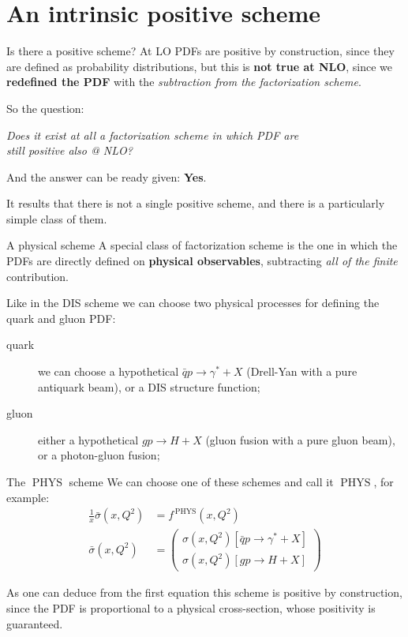 \documentclass[9pt]{beamer}
\DeclareMathOperator{\phys}{PHYS}
\begin{document}
\section{An intrinsic positive scheme}
\begin{frame}{Is there a positive scheme?}
    At LO PDFs are positive by construction, since they are defined as
    probability distributions, but this is \textbf{not true at NLO}, since we
    \textbf{redefined the PDF} with the \textit{subtraction from the
    factorization scheme}.\newline

    So the question:

    \begin{center}
        \textit{Does it exist at all a factorization scheme in which PDF are\\ still positive also @ NLO?}
    \end{center}

    And the answer can be ready given: \textbf{Yes}.\newline

    It results that there is not a single positive scheme, and there is a
    particularly simple class of them.
\end{frame}

\begin{frame}{A physical scheme}
    A special class of factorization scheme is the one in which the PDFs are
    directly defined on \textbf{physical observables}, subtracting \textit{all
    of the finite} contribution.

    Like in the DIS scheme we can choose two physical processes for defining the quark and gluon PDF:
    \begin{description}
        \item[quark] we can choose a hypothetical $\bar{q} p \to \gamma^* + X$
        (Drell-Yan with a pure antiquark beam), or a DIS structure function;
        \item[gluon] either a hypothetical $g p \to H + X$ (gluon fusion with a
        pure gluon beam), or a photon-gluon fusion;
    \end{description}
\end{frame}

\begin{frame}{The $\phys$ scheme}
    We can choose one of these schemes and call it $\phys$, for example:
    \begin{align*}
        \frac{1}{x}\bar{\sigma}(x,Q^2) &= f^{\,\phys}(x,Q^2)\\
        \bar{\sigma}(x,Q^2) &= \begin{pmatrix}
        \sigma(x,Q^2)[\bar{q} p \to \gamma^* + X]\\
        \sigma(x,Q^2)[g p \to H + X]
        \end{pmatrix}
    \end{align*}

    As one can deduce from the first equation this scheme is positive by
    construction, since the PDF is proportional to a physical cross-section,
    whose positivity is guaranteed.
\end{frame}
\end{document}
